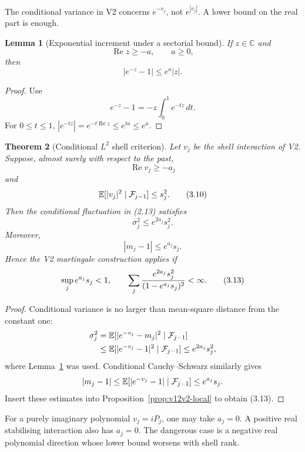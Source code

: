 \documentclass[11pt]{article}
\newtheorem{theorem}{Theorem}[section]
\newtheorem{lemma}[theorem]{Lemma}
\theoremstyle{remark}
\begin{document}
The conditional variance in V2 concerns \(e^{-v_j}\), not
\(e^{|v_j|}\).  A lower bound on the real part is enough.

\begin{lemma}[Exponential increment under a sectorial bound]
\label{lem:v12v3-sectorial}
If \(z\in\mathbb C\) and
\[
                              \operatorname{Re}z\ge-a,
                  \qquad a\ge0,                             \tag{3.7}
\]
then
\[
                              |e^{-z}-1|\le e^a|z|.           \tag{3.8}
\]
\end{lemma}

\begin{proof}
Use
\[
 e^{-z}-1=-z\int_0^1e^{-tz}\,dt.
\]
For \(0\le t\le1\),
\(|e^{-tz}|=e^{-t\operatorname{Re}z}\le e^{ta}\le e^a\).
\end{proof}

\begin{theorem}[Conditional \(L^2\) shell criterion]
\label{thm:v12v3-L2}
Let \(v_j\) be the shell interaction of V2.  Suppose, almost surely
with respect to the past,
\[
                       \operatorname{Re}v_j\ge-a_j           \tag{3.9}
\]
and
\[
                       \mathbb E[|v_j|^2\mid{\cal F}_{j-1}]
                       \le s_j^2.                           \tag{3.10}
\]
Then the conditional fluctuation in (2.13) satisfies
\[
                              \sigma_j^2\le e^{2a_j}s_j^2.   \tag{3.11}
\]
Moreover,
\[
                              |m_j-1|\le e^{a_j}s_j.          \tag{3.12}
\]
Hence the V2 martingale construction applies if
\[
 \sup_j e^{a_j}s_j<1,\qquad
 \sum_j{e^{2a_j}s_j^2\over(1-e^{a_j}s_j)^2}<\infty.          \tag{3.13}
\]
\end{theorem}

\begin{proof}
Conditional variance is no larger than mean-square distance from the
constant one:
\[
 \begin{split}
 \sigma_j^2
 &=\mathbb E[|e^{-v_j}-m_j|^2\mid{\cal F}_{j-1}]\\
 &\le\mathbb E[|e^{-v_j}-1|^2\mid{\cal F}_{j-1}]
 \le e^{2a_j}s_j^2,
 \end{split}
\]
where Lemma~\ref{lem:v12v3-sectorial} was used.  Conditional
Cauchy--Schwarz similarly gives
\[
 |m_j-1|
 \le\mathbb E[|e^{-v_j}-1|\mid{\cal F}_{j-1}]
 \le e^{a_j}s_j.
\]
Insert these estimates into Proposition~\ref{prop:v12v2-local} to obtain (3.13).
\end{proof}

For a purely imaginary polynomial \(v_j=iP_j\), one may take
\(a_j=0\).  A positive real stabilising interaction also has
\(a_j=0\).  The dangerous case is a negative real polynomial direction
whose lower bound worsens with shell rank.
\end{document}
